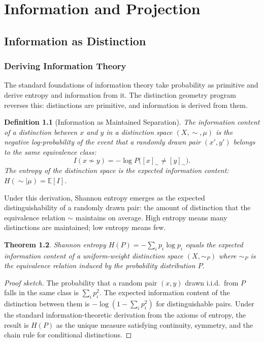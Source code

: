 \documentclass[12pt,a4paper]{book}
\newtheorem{theorem}{Theorem}[chapter]
\newtheorem{definition}[theorem]{Definition}
\theoremstyle{remark}
\theoremstyle{definition}
\begin{document}
\part{Information and Projection}

\chapter{Information as Distinction}

\section{Deriving Information Theory}

The standard foundations of information theory take probability as
primitive and derive entropy and information from it. The distinction
geometry program reverses this: distinctions are primitive, and
information is derived from them.

\begin{definition}[Information as Maintained Separation]
The \emph{information content} of a distinction between $x$ and $y$
in a distinction space $(X, \sim, \mu)$ is the negative log-probability
of the event that a randomly drawn pair $(x',y')$ belongs to the same
equivalence class:
\begin{equation}
  I(x \not\sim y)
  = -\log P\bigl([x]_\sim \neq [y]_\sim\bigr).
\end{equation}
The \emph{entropy} of the distinction space is the expected information
content: $H(\sim \mid \mu) = \mathbb{E}[I]$.
\end{definition}

Under this derivation, Shannon entropy emerges as the expected
distinguishability of a randomly drawn pair: the amount of distinction
that the equivalence relation $\sim$ maintains on average. High entropy
means many distinctions are maintained; low entropy means few.

\begin{theorem}
Shannon entropy $H(P) = -\sum_i p_i\log p_i$ equals the expected
information content of a uniform-weight distinction space $(X, \sim_P)$
where $\sim_P$ is the equivalence relation induced by the probability
distribution $P$.
\end{theorem}

\begin{proof}[Proof sketch]
The probability that a random pair $(x, y)$ drawn i.i.d.\ from $P$
falls in the same class is $\sum_i p_i^2$. The expected information
content of the distinction between them is $-\log(1 - \sum_i p_i^2)$
for distinguishable pairs. Under the standard information-theoretic
derivation from the axioms of entropy, the result is $H(P)$ as the
unique measure satisfying continuity, symmetry, and the chain rule for
conditional distinctions.
\end{proof}
\end{document}

